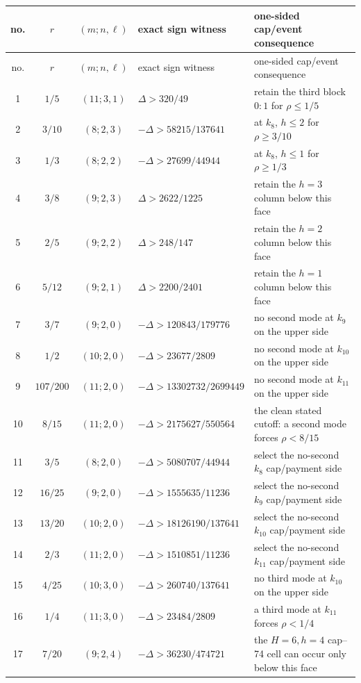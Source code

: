 \documentclass[11pt]{article}
\newcommand{\Dlt}{\Delta}
\begin{document}
\begingroup
\small
\renewcommand{\arraystretch}{1.16}
\begin{longtable}{@{}c c c L{3.15cm} L{5.35cm}@{}}
\toprule
no.&\(r\)&\((m;n,\ell)\)&exact sign witness&one-sided cap/event consequence\\
\midrule
\endfirsthead
\toprule
no.&\(r\)&\((m;n,\ell)\)&exact sign witness&one-sided cap/event consequence\\
\midrule
{}&\(1/5\)&\((11;3,1)\)&
 \(\Dlt>320/49\)&retain the third block \(0{:}1\) for \(\rho\leq1/5\)\\
2&\(3/10\)&\((8;2,3)\)&
 \(-\Dlt>58215/137641\)&at \(k_8\), \(h\leq2\) for \(\rho\geq3/10\)\\
3&\(1/3\)&\((8;2,2)\)&
 \(-\Dlt>27699/44944\)&at \(k_8\), \(h\leq1\) for \(\rho\geq1/3\)\\
4&\(3/8\)&\((9;2,3)\)&
 \(\Dlt>2622/1225\)&retain the \(h=3\) column below this face\\
5&\(2/5\)&\((9;2,2)\)&
 \(\Dlt>248/147\)&retain the \(h=2\) column below this face\\
6&\(5/12\)&\((9;2,1)\)&
 \(\Dlt>2200/2401\)&retain the \(h=1\) column below this face\\
7&\(3/7\)&\((9;2,0)\)&
 \(-\Dlt>120843/179776\)&no second mode at \(k_9\) on the upper side\\
8&\(1/2\)&\((10;2,0)\)&
 \(-\Dlt>23677/2809\)&no second mode at \(k_{10}\) on the upper side\\
9&\(107/200\)&\((11;2,0)\)&
 \(-\Dlt>13302732/2699449\)&no second mode at \(k_{11}\) on the upper side\\
10&\(8/15\)&\((11;2,0)\)&
 \(-\Dlt>2175627/550564\)&the clean stated cutoff: a second mode forces \(\rho<8/15\)\\
11&\(3/5\)&\((8;2,0)\)&
 \(-\Dlt>5080707/44944\)&select the no-second \(k_8\) cap/payment side\\
12&\(16/25\)&\((9;2,0)\)&
 \(-\Dlt>1555635/11236\)&select the no-second \(k_9\) cap/payment side\\
13&\(13/20\)&\((10;2,0)\)&
 \(-\Dlt>18126190/137641\)&select the no-second \(k_{10}\) cap/payment side\\
14&\(2/3\)&\((11;2,0)\)&
 \(-\Dlt>1510851/11236\)&select the no-second \(k_{11}\) cap/payment side\\
15&\(4/25\)&\((10;3,0)\)&
 \(-\Dlt>260740/137641\)&no third mode at \(k_{10}\) on the upper side\\
16&\(1/4\)&\((11;3,0)\)&
 \(-\Dlt>23484/2809\)&a third mode at \(k_{11}\) forces \(\rho<1/4\)\\
17&\(7/20\)&\((9;2,4)\)&
 \(-\Dlt>36230/474721\)&the \(H=6,h=4\) cap--74 cell can occur only below this face\\
\bottomrule
\end{longtable}
\endgroup
\end{document}
